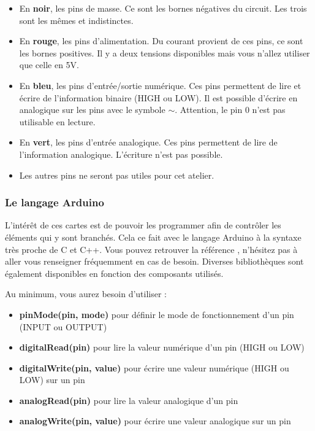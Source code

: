 
\begin{itemize}
	\item En \textbf{noir}, les pins de masse.
		  Ce sont les bornes négatives du circuit.
		  Les trois sont les mêmes et indistinctes.
	\item En \textbf{rouge}, les pins d'alimentation.
		  Du courant provient de ces pins, ce sont les bornes positives.
		  Il y a deux tensions disponibles mais vous n'allez utiliser que celle en 5V.
	\item En \textbf{bleu}, les pins d'entrée/sortie numérique.
		  Ces pins permettent de lire et écrire de l'information binaire (HIGH ou LOW).
		  Il est possible d'écrire en analogique sur les pins avec le symbole \boldmath$\sim$.
		  Attention, le pin 0 n'est pas utilisable en lecture.
	\item En \textbf{vert}, les pins d'entrée analogique.
		  Ces pins permettent de lire de l'information analogique.
		  L'écriture n'est pas possible.
	\item Les autres pins ne seront pas utiles pour cet atelier.
\end{itemize}

\subsubsection{Le langage Arduino}

L'intérêt de ces cartes est de pouvoir les programmer afin de contrôler les éléments qui y sont branchés.
Cela ce fait avec le langage Arduino à la syntaxe très proche de C et C++.
Vous pouvez retrouver la référence , n'hésitez pas à aller vous renseigner fréquemment en cas de besoin.
Diverses bibliothèques sont également disponibles en fonction des composants utilisés.

\br
Au minimum, vous aurez besoin d'utiliser :
\begin{itemize}
	\item \textbf{pinMode(pin, mode)} pour définir le mode de fonctionnement d'un pin (INPUT ou OUTPUT)
	\item \textbf{digitalRead(pin)} pour lire la valeur numérique d'un pin (HIGH ou LOW)
	\item \textbf{digitalWrite(pin, value)} pour écrire une valeur numérique (HIGH ou LOW) sur un pin
	\item \textbf{analogRead(pin)} pour lire la valeur analogique d'un pin
	\item \textbf{analogWrite(pin, value)} pour écrire une valeur analogique sur un pin	
\end{itemize}

